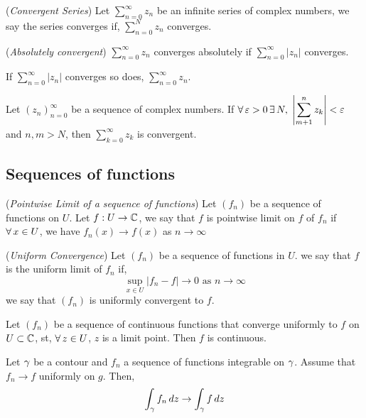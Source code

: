 \documentclass{article}
\begin{document}
\begin{ndefi}{(\textit{Convergent Series})}
  Let $\displaystyle{\sum_{n=0}^\infty {z_n}}$ be an infinite series of complex numbers, we say the series converges if, $\displaystyle{\sum_{n=0}^N {z_n}}$ converges.
\end{ndefi}

\begin{ndefi}{(\textit{Absolutely convergent})}
  $\displaystyle{\sum_{n=0}^\infty {z_n}}$ converges absolutely if $\displaystyle{\sum_{n=0}^\infty {|z_n|}}$ converges.
\end{ndefi}

\begin{nlemma}
  If $\displaystyle{\sum_{n=0}^\infty {|z_n|}}$ converges so does, $\displaystyle{\sum_{n=0}^\infty {z_n}}$.
\end{nlemma}

\begin{ncor}
  Let $(z_n)_{n=0}^\infty$ be a sequence of complex numbers. If $\forall\,\varepsilon>0\,\exists\, N,$ $\displaystyle{\left| \sum^n_{m+1} {z_k} \right| < \varepsilon}$ and $n, m > N$, then $\displaystyle{\sum_{k=0}^\infty {z_k}}$ is convergent.
\end{ncor}

\subsection{Sequences of functions}
\begin{ndefi}{(\textit{Pointwise Limit of a sequence of functions})}
  Let $(f_n)$ be a sequence of functions on $U$. Let $f : U \to \mathbb{C}$, we say that $f$ is pointwise limit on $f$ of $f_n$ if $\forall\, x \in U$, we have $f_n(x) \to f(x)$ as $n \to \infty$
\end{ndefi}

\begin{ndefi}{(\textit{Uniform Convergence})}
  Let $(f_n)$ be a sequence of functions in $U$. we say that $f$ is the uniform limit of $f_n$ if,
  $$ \sup_{x\in U} {|f_n - f| \to 0} \text{ as $n\to \infty$} $$
  we say that $(f_n)$ is uniformly convergent to $f$.
\end{ndefi}

\begin{nthm}
  Let $(f_n)$ be a sequence of continuous functions that converge uniformly to $f$ on $U \subset\mathbb{C}$, st, $\forall\, z\in U$, $z$ is a limit point. Then $f$ is continuous.
\end{nthm}

\begin{nthm}
  Let $\gamma$ be a contour and $f_n$ a sequence of functions integrable on $\gamma$. Assume that $f_n \to f$ uniformly on $g$. Then,
  $$ \int_\gamma f_n\,dz \to \int_\gamma f\,dz $$
\end{nthm}
\end{document}
